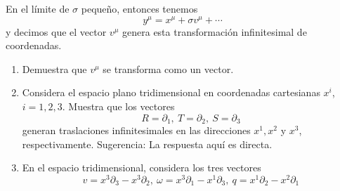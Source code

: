 \documentclass[../main]{subfiles}
\begin{document}
\begin{enumerate}
    En el límite de $\sigma$ pequeño, entonces tenemos 
    \begin{equation}
        y^{\mu}=x^{\mu}+\sigma v^{\mu}+\cdots 
    \end{equation}
    y decimos que el vector $v^{\mu}$ genera esta transformación infinitesimal de coordenadas. 
    \begin{enumerate}
        \item Demuestra que $v^{\mu}$ se transforma como un vector.
        \item Considera el espacio plano tridimensional en coordenadas cartesianas $x^{i}$, $i=1, 2, 3$. Muestra que los vectores 
        \begin{equation}
            R=\partial_1, \ T=\partial_2, \ S=\partial_3
        \end{equation}
        generan traslaciones infinitesimales en las direcciones $x^1, x^2$ y $x^3$, respectivamente. Sugerencia: La respuesta aquí es directa.
        \item En el espacio tridimensional, considera los tres vectores 
        \begin{equation}
            v=x^3\partial_3-x^3\partial_2, \ \omega=x^3\partial_1-x^1\partial_3, \ q=x^1\partial_2-x^2\partial_1
        \end{equation}


\end{enumerate}
\end{enumerate}
\end{document}
